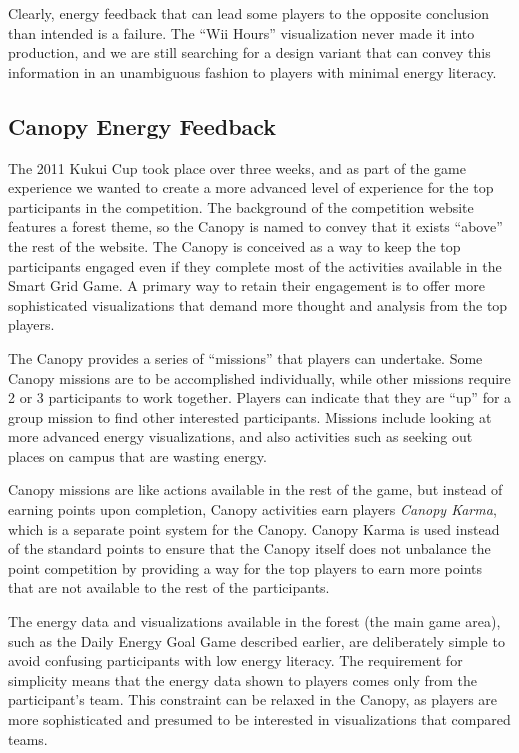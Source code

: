 \documentclass[10pt, conference, compsocconf]{IEEEtran-old}
\begin{document}
Clearly, energy feedback that can lead some players to the opposite conclusion than intended is a failure. The ``Wii Hours'' visualization never made it into production, and we are still searching for a design variant that can convey this information in an unambiguous fashion to players with minimal energy literacy.

\subsection{Canopy Energy Feedback}

The 2011 Kukui Cup took place over three weeks, and as part of the game experience we wanted to create a more advanced level of experience for the top participants in the competition. The background of the competition website features a forest theme, so the Canopy is named to convey that it exists ``above'' the rest of the website. The Canopy is conceived as a way to keep the top participants engaged even if they complete most of the activities available in the Smart Grid Game. A primary way to retain their engagement is to offer more sophisticated visualizations that demand more thought and analysis from the top players.

The Canopy provides a series of ``missions'' that players can undertake. Some Canopy missions are to be accomplished individually, while other missions require 2 or 3 participants to work together. Players can indicate that they are ``up'' for a group mission to find other interested participants. Missions include looking at more advanced energy visualizations, and also activities such as seeking out places on campus that are wasting energy.

Canopy missions are like actions available in the rest of the game, but instead of earning points upon completion, Canopy activities earn players \emph{Canopy Karma}, which is a separate point system for the Canopy. Canopy Karma is used instead of the standard points to ensure that the Canopy itself does not unbalance the point competition by providing a way for the top players to earn more points that are not available to the rest of the participants.

The energy data and visualizations available in the forest (the main game area), such as the Daily Energy Goal Game described earlier, are deliberately simple to avoid confusing participants with low energy literacy. The requirement for simplicity means that the energy data shown to players comes only from the participant's team. This constraint can be relaxed in the Canopy, as players are more sophisticated and presumed to be interested in visualizations that compared teams.
\end{document}
